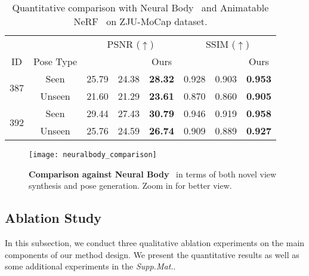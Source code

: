 \begin{table}[t]
  \centering
  \scriptsize
  \caption{Quantitative comparison with Neural Body~\cite{peng2021neuralbody} and Animatable NeRF~\cite{peng2021animatable_nerf} on ZJU-MoCap dataset.}
    \begin{tabular}{ccrrrrrr}
    \toprule
          &       & \multicolumn{3}{c}{PSNR ($\uparrow$)} & \multicolumn{3}{c}{SSIM ($\uparrow$)} \\
    \cmidrule(r){3-5} \cmidrule(r){6-8} 
    \multicolumn{1}{c}{ID} & Pose Type & \multicolumn{1}{c}{\cite{peng2021neuralbody}} & \multicolumn{1}{c}{\cite{peng2021animatable_nerf}} & \multicolumn{1}{c}{Ours} & \multicolumn{1}{c}{\cite{peng2021neuralbody}} & \multicolumn{1}{c}{\cite{peng2021animatable_nerf}} & \multicolumn{1}{c}{Ours} \\
    \midrule 
    \multirow{2}{*}{387} & Seen  & 25.79 & 24.38     & \textbf{28.32}     & 0.928 & 0.903     & \textbf{0.953} \\
          & Unseen & 21.60 & 21.29     & \textbf{23.61}     & 0.870  & 0.860     & \textbf{0.905} \\
    \midrule 
    \multirow{2}{*}{392} & Seen  & 29.44 & 27.43 & \textbf{30.79} & 0.946 & 0.919 & \textbf{0.958} \\
          & Unseen & 25.76 & 24.59 & \textbf{26.74} & 0.909 & 0.889 & \textbf{0.927} \\
    \bottomrule
    \end{tabular}%
  \label{tab:neuralbody_comparison}%
\end{table}%


\begin{figure}
    \centering
    \texttt{[image: neuralbody\_comparison]}
    \caption{\textbf{Comparison against Neural Body}~\cite{peng2021neuralbody} in terms of both novel view synthesis and pose generation. Zoom in for better view.}
    \label{fig:neuralbody_comparison}
\end{figure}



\subsection{Ablation Study}
\label{sec:experiments:evaluation}
In this subsection, we conduct three qualitative ablation experiments on the main components of our method design. We present the quantitative results as well as some additional experiments in the \textit{Supp.Mat.}. 

